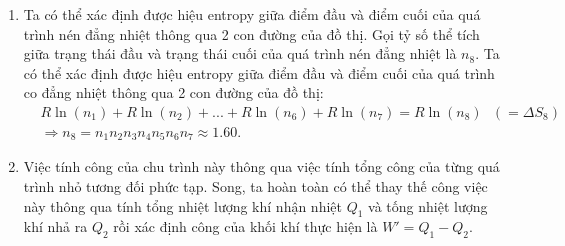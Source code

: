 \begin{enumerate}[label=\textbf{\alph*,}]
\begin{center}
\end{center}


\item Ta có thể xác định được hiệu entropy giữa điểm đầu và điểm cuối của quá trình nén đẳng nhiệt thông qua 2 con đường của đồ thị. Gọi tỷ số thể tích giữa trạng thái đầu và trạng thái cuối của quá trình nén đẳng nhiệt là $n_8$. Ta có thể xác định được hiệu entropy giữa điểm đầu và điểm cuối của quá trình co đẳng nhiệt thông qua 2 con đường của đồ thị:
\begin{equation} \label{eq6_P2_d1}
    \begin{split}
        & R \ln (n_1) + R \ln (n_2) + ... + R \ln (n_6) + R \ln (n_7) = R \ln (n_8) \ \ \ (= \Delta S_8) \\
        & \Rightarrow n_8 = n_1 n_2 n_3 n_4 n_5 n_6 n_7 \approx 1.60.
    \end{split}
\end{equation}

\item Việc tính công của chu trình này thông qua việc tính tổng công của từng quá trình nhỏ tương đối phức tạp. Song, ta hoàn toàn có thể thay thế công việc này thông qua tính tổng nhiệt lượng khí nhận nhiệt $Q_1$ và tống nhiệt lượng khí nhả ra $Q_2$ rồi xác định công của khối khí thực hiện là $W'=Q_1-Q_2$.


\end{enumerate}
